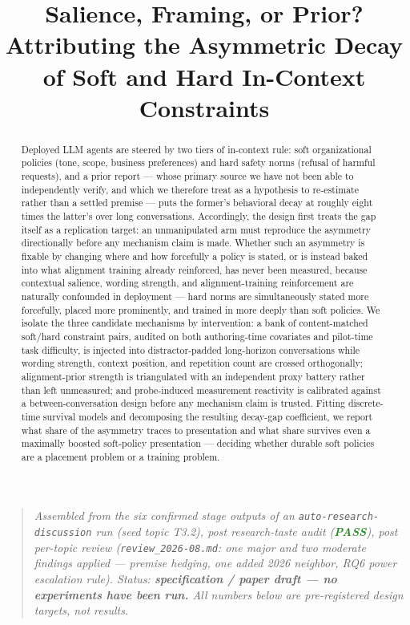 \documentclass[11pt]{article}
\title{\textbf{Salience, Framing, or Prior?\\ Attributing the Asymmetric Decay of Soft and Hard In-Context Constraints}}
\author{}
\date{}
\begin{document}
\maketitle
\vspace{-2em}

\begin{quote}
\small\textit{Assembled from the six confirmed stage outputs of an \texttt{auto-research-discussion} run (seed topic T3.2), post research-taste audit (\textcolor{ForestGreen}{\textbf{PASS}}), post per-topic review (\texttt{review\_2026-08.md}: one major and two moderate findings applied --- premise hedging, one added 2026 neighbor, RQ6 power escalation rule). Status: \textbf{specification / paper draft --- no experiments have been run.} All numbers below are pre-registered design targets, not results.}
\end{quote}

\begin{abstract}
Deployed LLM agents are steered by two tiers of in-context rule: soft organizational policies (tone, scope, business preferences) and hard safety norms (refusal of harmful requests), and a prior report --- whose primary source we have not been able to independently verify, and which we therefore treat as a hypothesis to re-estimate rather than a settled premise --- puts the former's behavioral decay at roughly eight times the latter's over long conversations. Accordingly, the design first treats the gap itself as a replication target: an unmanipulated arm must reproduce the asymmetry directionally before any mechanism claim is made. Whether such an asymmetry is fixable by changing where and how forcefully a policy is stated, or is instead baked into what alignment training already reinforced, has never been measured, because contextual salience, wording strength, and alignment-training reinforcement are naturally confounded in deployment --- hard norms are simultaneously stated more forcefully, placed more prominently, and trained in more deeply than soft policies. We isolate the three candidate mechanisms by intervention: a bank of content-matched soft/hard constraint pairs, audited on both authoring-time covariates and pilot-time task difficulty, is injected into distractor-padded long-horizon conversations while wording strength, context position, and repetition count are crossed orthogonally; alignment-prior strength is triangulated with an independent proxy battery rather than left unmeasured; and probe-induced measurement reactivity is calibrated against a between-conversation design before any mechanism claim is trusted. Fitting discrete-time survival models and decomposing the resulting decay-gap coefficient, we report what share of the asymmetry traces to presentation and what share survives even a maximally boosted soft-policy presentation --- deciding whether durable soft policies are a placement problem or a training problem.
\end{abstract}
\end{document}

